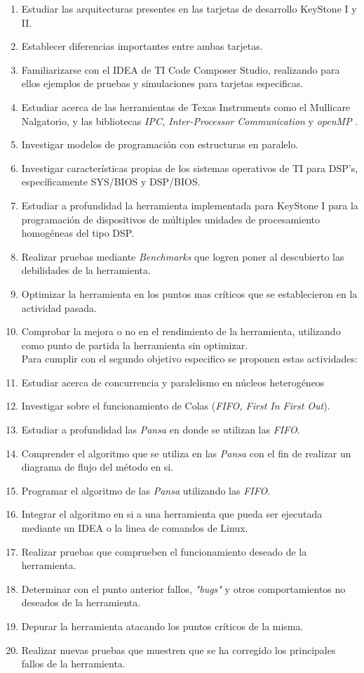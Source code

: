 \begin{enumerate}
 \item Estudiar las arquitecturas presentes en las tarjetas de desarrollo KeyStone I y II.
 \item Establecer diferencias importantes entre ambas tarjetas.
 \item Familiarizarse con el IDEA de TI Code Composer Studio, realizando para ellos ejemplos de pruebas
 y simulaciones para tarjetas especificas.
 \item Estudiar acerca de las herramientas de Texas Instruments como el Mullicare Nalgatorio, y las
 bibliotecas \textit{IPC, Inter-Processor Communication} y \textit{openMP} .
 \item Investigar modelos de programación con estructuras en paralelo.
 \item Investigar características propias de los sistemas operativos de TI para DSP's, específicamente
 SYS/BIOS y DSP/BIOS.
 \item Estudiar a profundidad la herramienta implementada para KeyStone I para la programación
 de dispositivos de múltiples unidades de procesamiento homogéneas del tipo DSP.
 \item Realizar pruebas mediante \textit{Benchmarks} que logren poner al descubierto las debilidades
 de la herramienta.
 \item Optimizar la herramienta en los puntos mas críticos que se establecieron en la actividad pasada.
 \item Comprobar la mejora o no en el rendimiento de la herramienta, utilizando como punto de partida
 la herramienta sin optimizar.\\
 
 Para cumplir con el segundo objetivo especifico se proponen estas actividades: \\
 
 \item Estudiar acerca de concurrencia y paralelismo en núcleos heterogéneos
 \item Investigar sobre el funcionamiento de Colas (\textit{FIFO, First In First Out}).
 \item Estudiar a profundidad las \textit{Pansa} en donde se utilizan las \textit{FIFO}.
 \item Comprender el algoritmo que se utiliza en las \textit{Pansa} con el fin de realizar un diagrama
 de flujo del método en si.
 \item Programar el algoritmo de las \textit{Pansa} utilizando las \textit{FIFO}.
 \item Integrar el algoritmo en si a una herramienta que pueda ser ejecutada mediante un IDEA o la linea de
 comandos de Linux.
 \item Realizar pruebas que comprueben el funcionamiento deseado de la herramienta.
 \item Determinar con el punto anterior fallos, \textit{"bugs"} y otros comportamientos no deseados 
 de la herramienta.
 \item Depurar la herramienta atacando los puntos críticos de la misma.
 \item Realizar nuevas pruebas que muestren que se ha corregido los principales fallos de la herramienta.\\
 

\end{enumerate}
